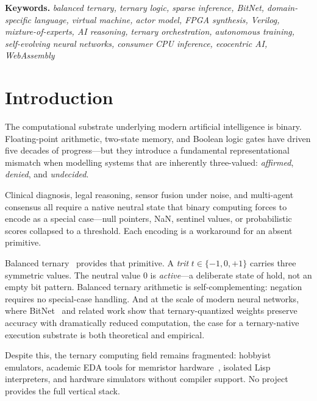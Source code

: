 \documentclass[11pt,a4paper]{article}
\newenvironment{IEEEkeywords}{%
  \list{}{%
    \setlength{\leftmargin}{0.085\linewidth}%
    \setlength{\rightmargin}{0.085\linewidth}%
    \setlength{\topsep}{0.3em}}%
  \item\relax\small\noindent\textbf{Keywords.}\space\itshape}%
  {\endlist\par\medskip}
\begin{document}
\begin{IEEEkeywords}
balanced ternary, ternary logic, sparse inference, BitNet, domain-specific
language, virtual machine, actor model, FPGA synthesis, Verilog,
mixture-of-experts, AI reasoning, ternary orchestration, autonomous training,
self-evolving neural networks, consumer CPU inference, ecocentric AI, WebAssembly
\end{IEEEkeywords}

\noindent{\normalcolor\rule{\linewidth}{0.6pt}}
{\setlength{\parskip}{0pt}\renewcommand{\baselinestretch}{0.96}\small
 \tableofcontents\par}
\noindent{\normalcolor\rule{\linewidth}{0.6pt}}
\vspace{0.6em}

\section{Introduction}
\label{sec:intro}

The computational substrate underlying modern artificial intelligence is
binary. Floating-point arithmetic, two-state memory, and Boolean logic gates
have driven five decades of progress—but they introduce a fundamental
representational mismatch when modelling systems that are inherently
three-valued: \emph{affirmed}, \emph{denied}, and \emph{undecided}.

Clinical diagnosis, legal reasoning, sensor fusion under noise, and
multi-agent consensus all require a native neutral state that binary computing
forces to encode as a special case—null pointers, NaN, sentinel values, or
probabilistic scores collapsed to a threshold. Each encoding is a workaround
for an absent primitive.

Balanced ternary~\cite{knuth1997art} provides that primitive. A \emph{trit}
$t \in \{-1, 0, +1\}$ carries three symmetric values. The neutral value $0$
is \emph{active}—a deliberate state of hold, not an empty bit pattern.
Balanced ternary arithmetic is self-complementing: negation requires no
special-case handling. And at the scale of modern neural networks, where
BitNet~\cite{ma2024era} and related work show that ternary-quantized weights
preserve accuracy with dramatically reduced computation, the case for a
ternary-native execution substrate is both theoretical and empirical.

Despite this, the ternary computing field remains fragmented: hobbyist
emulators, academic EDA tools for memristor hardware~\cite{bos2020ternary},
isolated Lisp interpreters, and hardware simulators without compiler support.
No project provides the full vertical stack.
\end{document}
